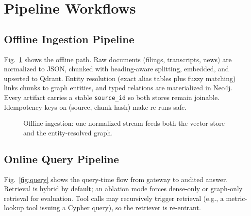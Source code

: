 \documentclass[conference]{IEEEtran}
\begin{document}
\section{Pipeline Workflows}\label{sec:workflows}

\subsection{Offline Ingestion Pipeline}
Fig.~\ref{fig:ingest} shows the offline path. Raw documents (filings, transcripts, news) are normalized to JSON, chunked with heading-aware splitting, embedded, and upserted to Qdrant. Entity resolution (exact alias tables plus fuzzy matching) links chunks to graph entities, and typed relations are materialized in Neo4j. Every artifact carries a stable \texttt{source\_id} so both stores remain joinable. Idempotency keys on (source, chunk hash) make re-runs safe.

\begin{figure}[t]
\centering
{}
\caption{Offline ingestion: one normalized stream feeds both the vector store and the entity-resolved graph.}
\label{fig:ingest}
\end{figure}

\subsection{Online Query Pipeline}
Fig.~\ref{fig:query} shows the query-time flow from gateway to audited answer. Retrieval is hybrid by default; an ablation mode forces dense-only or graph-only retrieval for evaluation. Tool calls may recursively trigger retrieval (e.g., a metric-lookup tool issuing a Cypher query), so the retriever is re-entrant.
\end{document}

